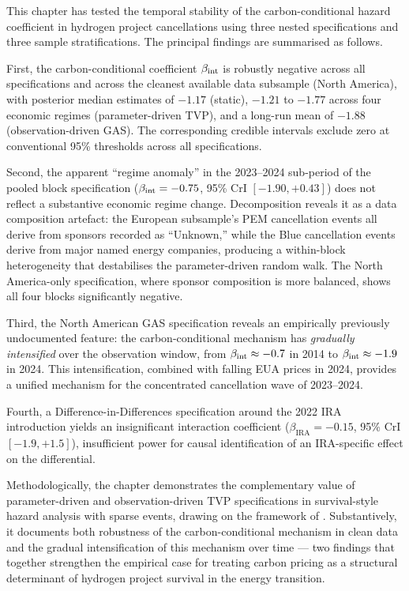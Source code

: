 \label{sec:ch7-conclusion}

This chapter has tested the temporal stability of the carbon-conditional hazard coefficient in hydrogen project cancellations using three nested specifications and three sample stratifications. The principal findings are summarised as follows.

First, the carbon-conditional coefficient $\beta_{\mathrm{int}}$ is robustly negative across all specifications and across the cleanest available data subsample (North America), with posterior median estimates of $-1.17$ (static), $-1.21$ to $-1.77$ across four economic regimes (parameter-driven TVP), and a long-run mean of $-1.88$ (observation-driven GAS). The corresponding credible intervals exclude zero at conventional 95\% thresholds across all specifications.

Second, the apparent ``regime anomaly'' in the 2023--2024 sub-period of the pooled block specification ($\beta_{\mathrm{int}} = -0.75$, 95\% CrI $[-1.90, +0.43]$) does not reflect a substantive economic regime change. Decomposition reveals it as a data composition artefact: the European subsample's PEM cancellation events all derive from sponsors recorded as ``Unknown,'' while the Blue cancellation events derive from major named energy companies, producing a within-block heterogeneity that destabilises the parameter-driven random walk. The North America-only specification, where sponsor composition is more balanced, shows all four blocks significantly negative.

Third, the North American GAS specification reveals an empirically previously undocumented feature: the carbon-conditional mechanism has \textit{gradually intensified} over the observation window, from $\beta_{\mathrm{int}} \approx -0.7$ in 2014 to $\beta_{\mathrm{int}} \approx -1.9$ in 2024. This intensification, combined with falling EUA prices in 2024, provides a unified mechanism for the concentrated cancellation wave of 2023--2024.

Fourth, a Difference-in-Differences specification around the 2022 IRA introduction yields an insignificant interaction coefficient ($\beta_{\mathrm{IRA}} = -0.15$, 95\% CrI $[-1.9, +1.5]$), insufficient power for causal identification of an IRA-specific effect on the differential.

Methodologically, the chapter demonstrates the complementary value of parameter-driven and observation-driven TVP specifications in survival-style hazard analysis with sparse events, drawing on the framework of \cite{koopman2016predicting}. Substantively, it documents both robustness of the carbon-conditional mechanism in clean data and the gradual intensification of this mechanism over time --- two findings that together strengthen the empirical case for treating carbon pricing as a structural determinant of hydrogen project survival in the energy transition.

